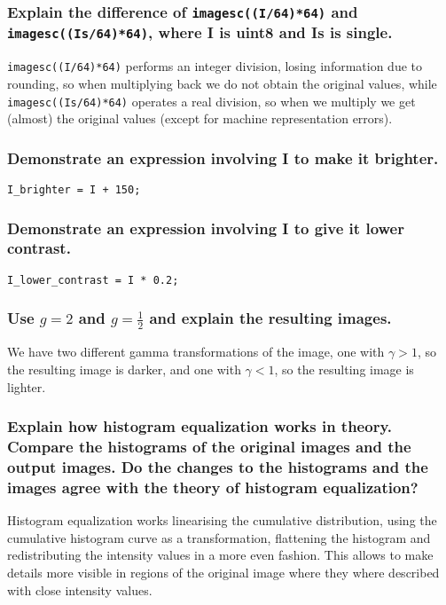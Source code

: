 \documentclass[a4paper]{article}
\begin{document}
\subsubsection*{Explain the difference of {\tt imagesc((I/64)*64)} and
    {\tt imagesc((Is/64)*64)}, where I is uint8 and Is is single.}

{\tt imagesc((I/64)*64)} performs an integer division, losing information due
to rounding, so when multiplying back we do not obtain the original values,
while {\tt imagesc((Is/64)*64)} operates a real division, so when we multiply
we get (almost) the original values (except for machine representation errors).

\subsubsection*{Demonstrate an expression involving I to make it brighter.}

{\tt I\_brighter = I + 150;}

\subsubsection*{Demonstrate an expression involving I to give it lower
contrast.}

{\tt I\_lower\_contrast = I * 0.2;}

\subsubsection*{Use $g = 2$ and $g = \frac{1}{2}$ and explain the 
    resulting images.}

We have two different gamma transformations of the image, one with $\gamma > 1$,
so the resulting image is darker, and one with $\gamma < 1$, so the resulting
image is lighter.


\subsubsection*{Explain how histogram equalization works in theory. Compare the histograms of the original images and the output images. Do the changes to 
    the histograms and the images agree with the theory of histogram 
    equalization?}

Histogram equalization works linearising the cumulative distribution, using the
cumulative histogram curve as a transformation, flattening the histogram and
redistributing the intensity values in a more even fashion. This allows to make
details more visible in regions of the original image where they where
described with close intensity values.  
\end{document}
